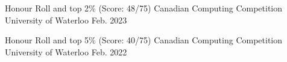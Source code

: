 
\begin{cvhonors}


  \cvhonor
    {Honour Roll and top 2\% (Score: 48/75)} %
    {Canadian Computing Competition} %
    {University of Waterloo} %
    {Feb. 2023} %

  \cvhonor
    {Honour Roll and top 5\% (Score: 40/75)} %
    {Canadian Computing Competition} %
    {University of Waterloo} %
    {Feb. 2022} %


\end{cvhonors}
